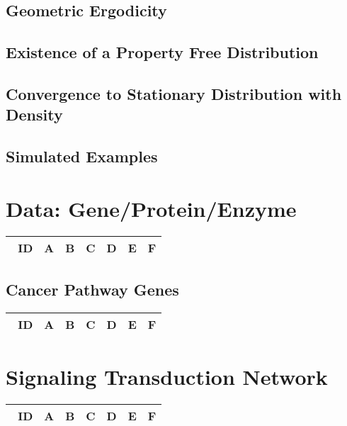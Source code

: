 \documentclass[preprint, 8pt]{elsarticle}
\theoremstyle{definition}
\begin{document}
\subsection{Geometric Ergodicity}
\subsection{Existence of a Property Free Distribution}
\subsection{Convergence to Stationary Distribution with Density}
\subsection{Simulated Examples}

\section{Data: Gene/Protein/Enzyme}

\begin{table}[H]\centering
\begin{tabular}{p{1cm}p{1cm}p{1cm}p{1cm}p{1cm}p{1cm}p{4cm}}\
ID & A & B & C & D & E & F \\
\hline
\hline
\end{tabular}
\end{table}

\subsection{Cancer Pathway Genes}

\begin{table}[H]\centering
\begin{tabular}{p{1cm}p{1cm}p{1cm}p{1cm}p{1cm}p{1cm}p{4cm}}\
ID & A & B & C & D & E & F \\
\hline
\hline
\end{tabular}
\end{table}

\section{Signaling Transduction Network}

\begin{table}[H]\centering
\begin{tabular}{p{1cm}p{1cm}p{1cm}p{1cm}p{1cm}p{1cm}p{4cm}}\
ID & A & B & C & D & E & F \\
\hline
\hline
\end{tabular}
\end{table}
\end{document}
